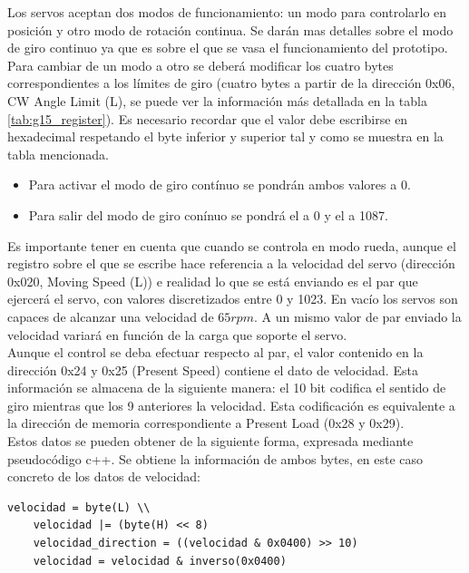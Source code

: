 		Los servos aceptan dos modos de funcionamiento: un modo para controlarlo en posición y otro modo de rotación continua. Se darán mas detalles sobre el modo de giro continuo ya que es sobre el que se vasa el funcionamiento del prototipo.
		\\

		Para cambiar de un modo a otro se deberá modificar los cuatro bytes correspondientes a los límites de giro (cuatro bytes a partir de la dirección 0x06, CW Angle Limit (L), se puede ver la información más detallada en la tabla \ref{tab:g15_register}). Es necesario recordar que el valor debe escribirse en hexadecimal respetando el byte inferior y superior tal y como se muestra en la tabla mencionada.

		\begin{itemize}
			\item Para activar el modo de giro contínuo se pondrán ambos valores a 0.
			\item Para salir del modo de giro conínuo se pondrá el  a 0 y el  a 1087.
		\end{itemize}

		Es importante tener en cuenta que cuando se controla en modo rueda, aunque el registro sobre el que se escribe hace referencia a la velocidad del servo (dirección 0x020, Moving Speed (L)) e realidad lo que se está enviando es el par que ejercerá el servo, con valores discretizados entre 0 y 1023. En vacío los servos son capaces de alcanzar una velocidad de $65rpm$. A un mismo valor de par enviado la velocidad variará en función de la carga que soporte el servo.
		\\

		Aunque el control se deba efectuar respecto al par, el valor contenido en la dirección 0x24 y 0x25 (Present Speed) contiene el dato de velocidad. Esta información se almacena de la siguiente manera: el 10 bit codifica el sentido de giro mientras que los 9 anteriores la velocidad. Esta codificación es equivalente a la dirección de memoria correspondiente a Present Load (0x28 y 0x29).
		\\

		Estos datos se pueden obtener de la siguiente forma, expresada mediante pseudocódigo c++. Se obtiene la información de ambos bytes, en este caso concreto de los datos de velocidad: 
		\begin{lstlisting}[frame=single]
	velocidad = byte(L) \\
	velocidad |= (byte(H) << 8)
	velocidad_direction = ((velocidad & 0x0400) >> 10)
	velocidad = velocidad & inverso(0x0400)
		\end{lstlisting}

